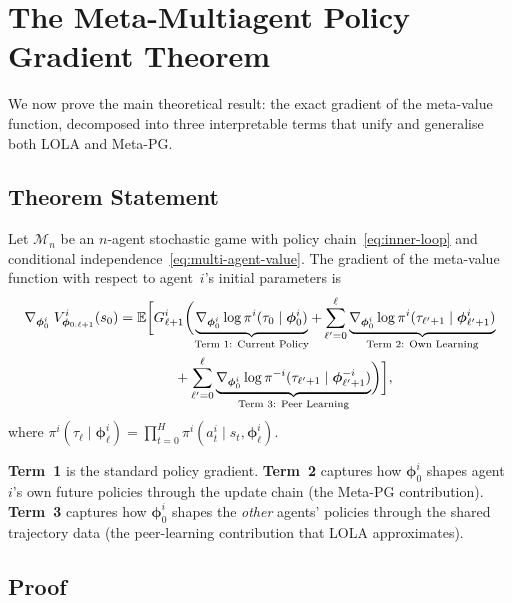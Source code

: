 
\chapter{The Meta-Multiagent Policy Gradient Theorem}
\label{ch:meta-mapg}

We now prove the main theoretical result: the exact gradient of the meta-value function, decomposed into three interpretable terms that unify and generalise both LOLA and Meta-PG.

\section{Theorem Statement}
\label{sec:meta-mapg-statement}

\begin{theorem}
\label{thm:meta-mapg}
Let $\mathcal{M}_n$ be an $n$-agent stochastic game with policy chain~\eqref{eq:inner-loop} and conditional independence~\eqref{eq:multi-agent-value}. The gradient of the meta-value function with respect to agent~$i$'s initial parameters is
\begin{align}
  \nabla_{\bm{\phi}_0^i}\;V^i_{\bm{\phi}_{0:\ell+1}}(s_0)
  &= \mathbb{E}\biggl[G_{\ell+1}^i \biggl(
    \underbrace{\nabla_{\bm{\phi}_0^i} \log\pi^i(\tau_0\mid\bm{\phi}_0^i)}_{\text{Term 1: Current Policy}}
    + \sum_{\ell'=0}^{\ell}\underbrace{\nabla_{\bm{\phi}_0^i}\log\pi^i(\tau_{\ell'+1}\mid\bm{\phi}_{\ell'+1}^i)}_{\text{Term 2: Own Learning}} \notag\\
  &\qquad\qquad
    + \sum_{\ell'=0}^{\ell}\underbrace{\nabla_{\bm{\phi}_0^i}\log\pi^{-i}(\tau_{\ell'+1}\mid\bm{\phi}_{\ell'+1}^{-i})}_{\text{Term 3: Peer Learning}}
  \biggr)\biggr],
  \label{eq:meta-mapg}
\end{align}
where $\pi^i(\tau_\ell\mid\bm{\phi}_\ell^i)=\prod_{t=0}^H\pi^i(a_t^i\mid s_t,\bm{\phi}_\ell^i)$.
\end{theorem}

\noindent\textbf{Term~1} is the standard policy gradient. \textbf{Term~2} captures how $\bm{\phi}_0^i$ shapes agent~$i$'s own future policies through the update chain (the Meta-PG contribution). \textbf{Term~3} captures how $\bm{\phi}_0^i$ shapes the \emph{other} agents' policies through the shared trajectory data (the peer-learning contribution that LOLA approximates).

\section{Proof}
\label{sec:meta-mapg-proof}

